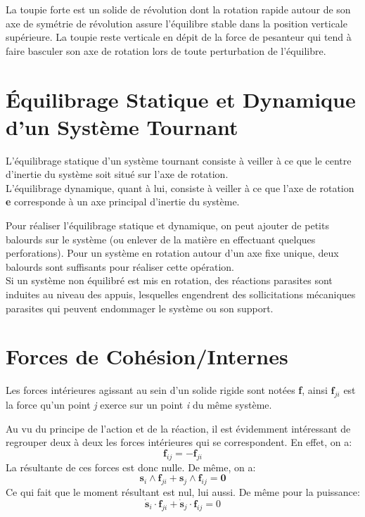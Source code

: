 \documentclass[a4paper]{article}
\begin{document}
La toupie forte est un solide de révolution dont la rotation rapide autour de son axe de symétrie de révolution assure l’équilibre stable dans la position verticale supérieure. La toupie reste verticale en dépit de la force de pesanteur qui tend à faire basculer son axe de rotation lors de toute perturbation de l’équilibre.










\section{Équilibrage Statique et Dynamique d’un Système Tournant}





L’équilibrage statique d’un système tournant consiste à veiller à ce que le centre d’inertie du système soit situé sur l’axe de rotation.  \\
L’équilibrage dynamique, quant à lui, consiste à veiller à ce que l’axe de rotation \textbf{e} corresponde à un axe principal d’inertie du système.

Pour réaliser l’équilibrage statique et dynamique, on peut ajouter de petits balourds sur le système (ou enlever de la matière en effectuant quelques perforations). Pour un système en rotation autour d’un axe fixe unique, deux balourds sont suffisants pour réaliser cette opération. \\
Si un système non équilibré est mis en rotation, des réactions parasites sont induites au niveau des appuis, lesquelles engendrent des sollicitations mécaniques parasites qui peuvent endommager le système ou son support.










\section{Forces de Cohésion/Internes}





Les forces intérieures agissant au sein d'un solide rigide sont notées \textbf{f}, ainsi $ \textbf{f}_{ji} $ est la force qu'un point \emph{j} exerce sur un point \emph{i} du même système.

Au vu du principe de l'action et de la réaction, il est évidemment intéressant de regrouper deux à deux les forces intérieures qui se correspondent. En effet, on a:
\[ \textbf{f}_{ij} = - \textbf{f}_{ji} \]
La résultante de ces forces est donc nulle. De même, on a:
\[ \textbf{s}_i \wedge \textbf{f}_{ji} + \textbf{s}_j \wedge \textbf{f}_{ij} = \textbf{0} \]
Ce qui fait que le moment résultant est nul, lui aussi. De même pour la puissance: 
\[ \dot{\textbf{s}}_i \cdot \textbf{f}_{ji} + \dot{\textbf{s}}_j \cdot \textbf{f}_{ij} = 0 \]
\end{document}
